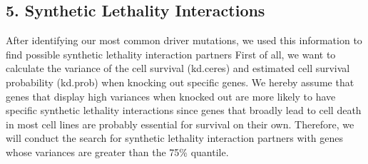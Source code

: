 \documentclass[]{article}
\newenvironment{Shaded}{\begin{snugshade}}{\end{snugshade}}
\newcommand{\CommentTok}[1]{\textcolor[rgb]{0.56,0.35,0.01}{\textit{#1}}}
\newcommand{\DecValTok}[1]{\textcolor[rgb]{0.00,0.00,0.81}{#1}}
\newcommand{\KeywordTok}[1]{\textcolor[rgb]{0.13,0.29,0.53}{\textbf{#1}}}
\newcommand{\NormalTok}[1]{#1}
\newcommand{\OperatorTok}[1]{\textcolor[rgb]{0.81,0.36,0.00}{\textbf{#1}}}
\newcommand{\StringTok}[1]{\textcolor[rgb]{0.31,0.60,0.02}{#1}}
\begin{document}
\begin{Shaded}
\end{Shaded}

\hypertarget{synthetic-lethality-interactions}{%
\subsection{5. Synthetic Lethality
Interactions}\label{synthetic-lethality-interactions}}

After identifying our most common driver mutations, we used this
information to find possible synthetic lethality interaction partners
First of all, we want to calculate the variance of the cell survival
(kd.ceres) and estimated cell survival probability (kd.prob) when
knocking out specific genes. We hereby assume that genes that display
high variances when knocked out are more likely to have specific
synthetic lethality interactions since genes that broadly lead to cell
death in most cell lines are probably essential for survival on their
own. Therefore, we will conduct the search for synthetic lethality
interaction partners with genes whose variances are greater than the
75\% quantile.
\end{document}

